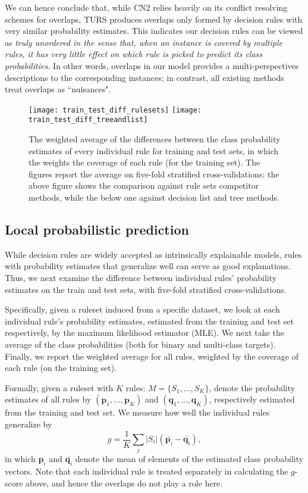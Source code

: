 We can hence conclude that, while CN2 relies heavily on its conflict resolving schemes for overlaps, TURS produces overlaps only formed by decision rules with very similar probability estimates. This indicates our decision rules can be viewed as \emph{truly unordered in the sense that, when an instance is covered by multiple rules, it has very little effect on which rule is picked to predict its class probabilities.} In other words, overlaps in our model provides a multi-perspectives descriptions to the corresponding instances; in contrast, all existing methods treat overlaps as ``nuisances". 

\begin{figure}[ht]\centering
\texttt{[image: train\_test\_diff\_rulesets]}
\texttt{[image: train\_test\_diff\_treeandlist]}
\caption{The weighted average of the differences between the class probability estimates of every individual rule for training and test sets, in which the weights the coverage of each rule (for the training set). The figures report the average on five-fold stratified cross-validations: the above figure shows the comparison against rule sets competitor methods, while the below one against decision list and tree methods.}
\label{fig:train_test_diff}
\end{figure}
\subsection{Local probabilistic prediction}
While decision rules are widely accepted as intrinsically explainable models, rules with probability estimates that generalize well can serve as good explanations. Thus, we next examine the difference between individual rules' probability estimates on the train and test sets, with five-fold stratified cross-validations. 

Specifically, given a ruleset induced from a specific dataset, we look at each individual rule's probability estimates, estimated from the training and test set respectively, by the maximum likelihood estimator (MLE). We next take the average of the class probabilities (both for binary and multi-class targets). Finally, we report the weighted average for all rules, weighted by the coverage of each rule (on the training set). 

Formally, given a ruleset with $K$ rules: $M = \{S_1, ..., S_K\}$, denote the probability estimates of all rules by $(\mathbf{p}_1, ..., \mathbf{p}_K)$ and $(\mathbf{q}_1, ..., \mathbf{q}_K)$, respectively estimated from the training and test set. We measure how well the individual rules generalize by
\begin{equation} \label{eq:train_test_diff}
	g = \frac{1}{K}\sum_{j} |S_i| (\bar{\mathbf{p}_i} - \bar{\mathbf{q}_i}),
\end{equation}
in which $\bar{\mathbf{p}_i}$ and $\bar{\mathbf{q}_i}$ denote the mean of elements of the estimated class probability vectors. Note that each individual rule is treated separately in calculating the $g$-score above, and hence the overlaps do not play a role here. 

